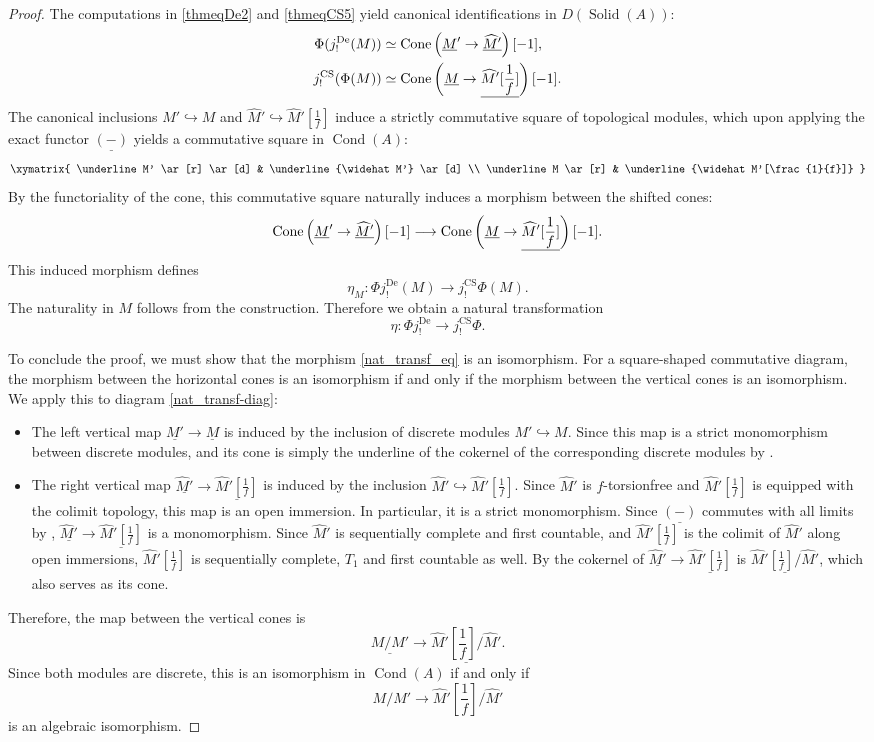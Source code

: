 \documentclass[11pt]{amsart}
\newcommand{\eq}[2]{\begin{equation}\label{#1}#2 \end{equation}}
\newcommand{\ra}{\rightarrow} %
\newcommand{\De}{\operatorname{De}}
\newcommand{\CS}{\operatorname{CS}}
\newcommand{\Cond}{\operatorname{Cond}}
\newcommand{\Solid}{\operatorname{Solid}}
\newcommand{\hra}{\hookrightarrow}
\renewcommand{\hat}{\widehat} %
\newcommand{\ul}{\underline}
\theoremstyle{plain}
\theoremstyle{definition}
\numberwithin{equation}{prop}
\begin{document}
\begin{proof}
The computations in \eqref{thmeqDe2} and \eqref{thmeqCS5} yield canonical identifications in $D(\Solid(A))$:
\begin{align*}
\Phi(j_!^{\De}(M)) &\simeq {\rm Cone}\left(\ul M' \to \ul{\hat M'}\right)[-1], \\
j_!^{\CS}(\Phi(M)) &\simeq {\rm Cone}\left(\ul M \to \ul{\hat M'[\frac{1}{f}]}\right)[-1].
\end{align*}
The canonical inclusions $M' \hra M$ and $\hat M' \hra \hat M'[\frac{1}{f}]$ induce a strictly commutative square of topological modules, which upon applying the exact functor $\ul{(-)}$ yields a commutative square in $\Cond(A)$:
\eq{nat_transf-diag}{
\xymatrix{
\ul M' \ar[r] \ar[d] & \ul{\hat M'} \ar[d] \\
\ul M \ar[r] & \ul{\hat M'[\frac{1}{f}]}
}
}
By the functoriality of the cone, this commutative square naturally induces a morphism between the shifted cones:
\eq{nat_transf_eq}{
{\rm Cone}\left(\ul M' \to \ul{\hat M'}\right)[-1] \longrightarrow {\rm Cone}\left(\ul M \to \ul{\hat M'[\frac{1}{f}]}\right)[-1].
}
This induced morphism defines
$$\eta_M:\Phi j_!^{\De}(M) \to j_!^{\CS} \Phi(M).$$
The naturality in $M$ follows from the construction.
Therefore we obtain a natural transformation 
$$\eta:\Phi j_!^{\De} \to j_!^{\CS} \Phi.$$




To conclude the proof, we must show that the morphism \eqref{nat_transf_eq} is an isomorphism. 
For a square-shaped commutative diagram, the morphism between the horizontal cones is an isomorphism if and only if the morphism between the vertical cones is an isomorphism. 
We apply this to diagram \eqref{nat_transf-diag}:
\begin{itemize} 
\item 
The left vertical map $\ul{M'} \to \ul{M}$ is induced by the inclusion of discrete modules $M' \hra M$. 
Since this map is a strict monomorphism between discrete modules, and its cone is simply the underline of the cokernel  of the corresponding discrete modules  by .
\item 
The right vertical map $\ul{\hat M'} \to \ul{\hat M'[\frac{1}{f}]}$ is induced by the inclusion $\hat M' \hra \hat M'[\frac{1}{f}]$. 
Since $\hat M'$ is $f$-torsionfree and $\hat M'[\frac{1}{f}]$ is equipped  with the colimit topology,  this map is an open immersion.
In particular, it is a strict monomorphism.
Since $\ul{(-)}$ commutes with all limits by ,
$\ul{\hat M'} \to \ul{\hat M'[\frac{1}{f}]}$ is a monomorphism.
Since $\hat M'$ is sequentially complete and first countable, and $\hat M'[\frac{1}{f}]$ is the colimit of $\hat M'$ along open immersions, $\hat M'[\frac{1}{f}]$ is sequentially complete, $T_1$ and first countable as well.
By  the cokernel of $\ul{\hat M'} \to \ul{\hat M'[\frac{1}{f}]}$ is $\ul{\hat M'[\frac{1}{f}]/\hat M'}$, which also serves as its cone.
\end{itemize}
Therefore, the map between the vertical cones is 
\eq{thmeq2}{ 
\ul{M/M'} \longrightarrow \ul{\hat M'[\frac{1}{f}] / \hat M'}. }
Since both modules are discrete, this is an isomorphism in $\Cond(A)$ if and only if 
$$ M/M'\ra \hat M'[\frac{1}{f}] / \hat M'$$
is an algebraic isomorphism.



\end{proof}
\end{document}
